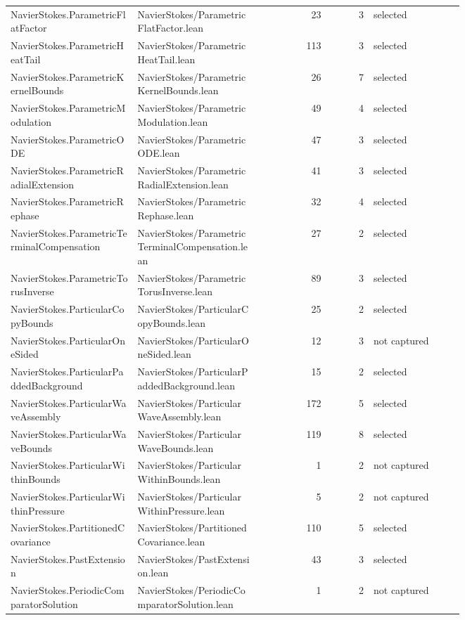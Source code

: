 \documentclass[10pt]{article}
\begin{document}
\begin{longtable}{p{0.28\linewidth}p{0.27\linewidth}r r p{0.20\linewidth}}
NavierStokes.ParametricFlatFactor & NavierStokes/ParametricFlatFactor.lean & 23 & 3 & selected\\
NavierStokes.ParametricHeatTail & NavierStokes/ParametricHeatTail.lean & 113 & 3 & selected\\
NavierStokes.ParametricKernelBounds & NavierStokes/ParametricKernelBounds.lean & 26 & 7 & selected\\
NavierStokes.ParametricModulation & NavierStokes/ParametricModulation.lean & 49 & 4 & selected\\
NavierStokes.ParametricODE & NavierStokes/ParametricODE.lean & 47 & 3 & selected\\
NavierStokes.ParametricRadialExtension & NavierStokes/ParametricRadialExtension.lean & 41 & 3 & selected\\
NavierStokes.ParametricRephase & NavierStokes/ParametricRephase.lean & 32 & 4 & selected\\
NavierStokes.ParametricTerminalCompensation & NavierStokes/ParametricTerminalCompensation.lean & 27 & 2 & selected\\
NavierStokes.ParametricTorusInverse & NavierStokes/ParametricTorusInverse.lean & 89 & 3 & selected\\
NavierStokes.ParticularCopyBounds & NavierStokes/ParticularCopyBounds.lean & 25 & 2 & selected\\
NavierStokes.ParticularOneSided & NavierStokes/ParticularOneSided.lean & 12 & 3 & not captured\\
NavierStokes.ParticularPaddedBackground & NavierStokes/ParticularPaddedBackground.lean & 15 & 2 & selected\\
NavierStokes.ParticularWaveAssembly & NavierStokes/ParticularWaveAssembly.lean & 172 & 5 & selected\\
NavierStokes.ParticularWaveBounds & NavierStokes/ParticularWaveBounds.lean & 119 & 8 & selected\\
NavierStokes.ParticularWithinBounds & NavierStokes/ParticularWithinBounds.lean & 1 & 2 & not captured\\
NavierStokes.ParticularWithinPressure & NavierStokes/ParticularWithinPressure.lean & 5 & 2 & not captured\\
NavierStokes.PartitionedCovariance & NavierStokes/PartitionedCovariance.lean & 110 & 5 & selected\\
NavierStokes.PastExtension & NavierStokes/PastExtension.lean & 43 & 3 & selected\\
NavierStokes.PeriodicComparatorSolution & NavierStokes/PeriodicComparatorSolution.lean & 1 & 2 & not captured\\

\end{longtable}
\end{document}
